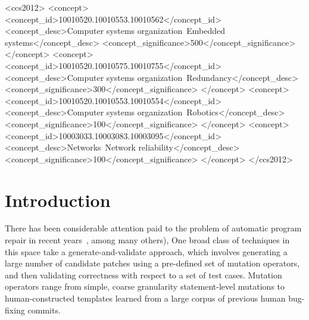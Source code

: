 \documentclass{sig-alternate-05-2015}
\begin{document}
%
%
\begin{CCSXML}
<ccs2012>
 <concept>
  <concept_id>10010520.10010553.10010562</concept_id>
  <concept_desc>Computer systems organization~Embedded systems</concept_desc>
  <concept_significance>500</concept_significance>
 </concept>
 <concept>
  <concept_id>10010520.10010575.10010755</concept_id>
  <concept_desc>Computer systems organization~Redundancy</concept_desc>
  <concept_significance>300</concept_significance>
 </concept>
 <concept>
  <concept_id>10010520.10010553.10010554</concept_id>
  <concept_desc>Computer systems organization~Robotics</concept_desc>
  <concept_significance>100</concept_significance>
 </concept>
 <concept>
  <concept_id>10003033.10003083.10003095</concept_id>
  <concept_desc>Networks~Network reliability</concept_desc>
  <concept_significance>100</concept_significance>
 </concept>
</ccs2012>  
\end{CCSXML}


%
%

%
%
\printccsdesc



\section{Introduction}

There has been considerable attention paid to the problem of automatic
program repair in recent
years~\cite{kim2013,legoues2012,pan2009,Weimer13, Qi13,
  Mechtaev15,prophet}, among many others),
%
One broad class of techniques in this space take a generate-and-validate
approach, which involves generating a large number of candidate patches using a
pre-defined set of mutation operators, and then validating correctness with
respect to a set of test cases.  Mutation operators range from simple, coarse
granularity statement-level mutations to human-constructed templates learned
from a large corpus of previous human bug-fixing commits.
\end{document}
